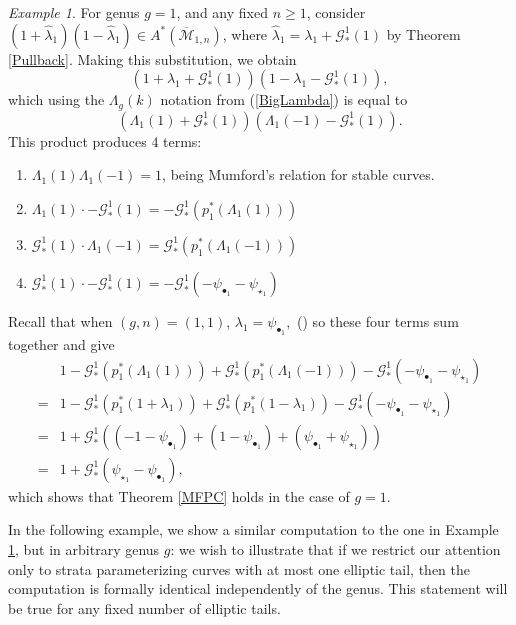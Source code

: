 \documentclass[leqno,12pt]{amsart}
\theoremstyle{remark}
\newtheorem{example}[theorem]{Example}
\numberwithin{equation}{section}
\begin{document}
\begin{example}\label{g=1} For genus $g=1$, and any fixed $n\geq 1$,  consider
$ (1 + \hat{\lambda}_1)(1 - \hat{\lambda}_1) \in A^*(\overline{\mathcal{M}}_{1, n})
$, 
where $\hat{\lambda}_1 = \lambda_1 + \mathcal{G}_*^1(1)$ by Theorem \ref{Pullback}. Making this substitution, we obtain %
$$
(1 + \lambda_1 + \mathcal{G}_*^1(1))(1 - \lambda_1 - \mathcal{G}_*^1(1)),
$$
which using the $\Lambda_g(k)$ notation from (\ref{BigLambda}) is equal to
$$
(\Lambda_1(1) + \mathcal{G}_*^1(1))(\Lambda_1(-1) - \mathcal{G}_*^1(1)).
$$
This product produces $4$ terms: 
\begin{enumerate}
    \item $\Lambda_1(1)\Lambda_1(-1) = 1$, being Mumford's relation for stable curves.
    \item $\Lambda_1(1)\cdot -\mathcal{G}_*^1(1) = - \mathcal{G}_*^1(p_1^\ast(\Lambda_1(1)))$
    \item $\mathcal{G}_*^1(1) \cdot \Lambda_1(-1) = \mathcal{G}_*^1(p_1^\ast(\Lambda_1(-1)))$
    \item $\mathcal{G}_*^1(1)\cdot -\mathcal{G}_*^1(1) = -\mathcal{G}_*^1(-\psi_{\bullet_1}-\psi_{\star_1})$
\end{enumerate}
Recall that when  $(g,n) = (1,1)$, $\lambda_1 = \psi_{\bullet_1},$ (\cite[Proposition 2.21  and Example 2.26]{zvonkine2014introduction}) so these four terms sum together and give
\begin{align*}
    &1 - \mathcal{G}_*^1(p_1^\ast(\Lambda_1(1))) + \mathcal{G}_*^1(p_1^\ast(\Lambda_1(-1))) - \mathcal{G}_*^1(-\psi_{\bullet_1}-\psi_{\star_1})\\ 
    = &1 - \mathcal{G}_*^1(p_1^\ast(1 + \lambda_1)) + \mathcal{G}_*^1(p_1^\ast(1 - \lambda_1)) - \mathcal{G}_*^1(-\psi_{\bullet_1}-\psi_{\star_1})\\
    = &1 + \mathcal{G}_*^1((-1 -\psi_{\bullet_1}) + (1 - \psi_{\bullet_1}) + (\psi_{\bullet_1} + \psi_{\star_1}))\\
    = &1 + \mathcal{G}_*^1(\psi_{\star_1}-\psi_{\bullet_1}),
\end{align*}
which shows that Theorem \ref{MFPC} holds in the case of $g=1$.
\end{example}

In the following example, we show a similar computation to the one in Example \ref{g=1}, but in arbitrary genus $g$: we wish to illustrate that if we restrict our attention only to strata parameterizing curves with at most one elliptic tail, then the computation is formally identical independently of the genus. This statement will be true for any fixed number of elliptic tails.
\end{document}
